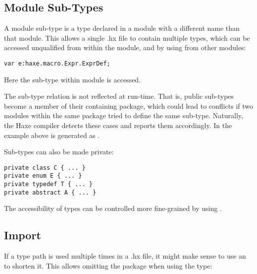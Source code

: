 \subsection{Module Sub-Types}
\label{type-system-module-sub-types}

A module sub-type is a type declared in a module with a different name than that module. This allows a single .hx file to contain multiple types, which can be accessed unqualified from within the module, and by using  from other modules:

\begin{lstlisting}
var e:haxe.macro.Expr.ExprDef;
\end{lstlisting}

Here the sub-type  within module  is accessed. 

The sub-type relation is not reflected at run-time. That is, public sub-types become a member of their containing package, which could lead to conflicts if two modules within the same package tried to define the same sub-type. Naturally, the Haxe compiler detects these cases and reports them accordingly. In the example above  is generated as .

Sub-types can also be made private:

\begin{lstlisting}
private class C { ... }
private enum E { ... }
private typedef T { ... }
private abstract A { ... }
\end{lstlisting}


The accessibility of types can be controlled more fine-grained by using .



\subsection{Import}
\label{type-system-import}

If a type path is used multiple times in a .hx file, it might make sense to use an  to shorten it. This allows omitting the package when using the type:

